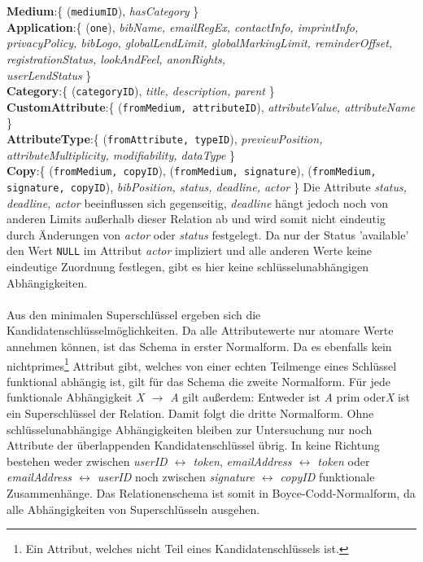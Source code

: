 \documentclass{article}
\begin{document}
\textbf{Medium}:\{ (\texttt{mediumID}), \textit{hasCategory} \}\\
\textbf{Application}:\{ (\texttt{one}),\textit{ bibName, emailRegEx, contactInfo, imprintInfo, privacyPolicy, bibLogo, globalLendLimit, globalMarkingLimit, reminderOffset, registrationStatus, lookAndFeel, anonRights,\\ userLendStatus} \}\\
\textbf{Category}:\{ (\texttt{categoryID}), \textit{title, description, parent} \}\\
\textbf{CustomAttribute}:\{ (\texttt{fromMedium, attributeID}),  \textit{attributeValue, attributeName} \}\\
\textbf{AttributeType}:\{ (\texttt{fromAttribute, typeID}), \textit{previewPosition, attributeMultiplicity, modifiability, dataType} \}\\
\textbf{Copy}:\{ (\texttt{fromMedium, copyID}), (\texttt{fromMedium, signature}), (\texttt{fromMedium, signature, copyID}), \textit{bibPosition, status, deadline, actor} \}
Die Attribute \textit{status, deadline, actor} beeinflussen sich gegenseitig, \textit{deadline} hängt jedoch noch von anderen Limits außerhalb dieser Relation ab und wird somit nicht eindeutig durch Änderungen von \textit{actor} oder \textit{status} festgelegt. Da nur der Status 'available' den Wert \texttt{NULL} im Attribut \textit{actor} impliziert und alle anderen Werte keine eindeutige Zuordnung festlegen, gibt es hier keine schlüsselunabhängigen Abhängigkeiten.\\
\\
Aus den minimalen Superschlüssel ergeben sich die Kandidatenschlüsselmöglichkeiten. Da alle Attributewerte nur atomare Werte annehmen können, ist das Schema in erster Normalform. Da es ebenfalls kein nichtprimes\footnote{Ein Attribut, welches nicht Teil eines Kandidatenschlüssels ist.} Attribut gibt, welches von einer echten Teilmenge eines Schlüssel funktional abhängig ist, gilt für das Schema die zweite Normalform. Für jede funktionale Abhängigkeit \textit{X $\rightarrow$ A} gilt außerdem: Entweder ist \textit{A} prim oder\textit{X} ist ein Superschlüssel der Relation. Damit folgt die dritte Normalform. Ohne schlüsselunabhängige Abhängigkeiten bleiben zur Untersuchung nur noch Attribute der überlappenden Kandidatenschlüssel übrig. In keine Richtung bestehen weder zwischen \textit{userID $\leftrightarrow$ token}, \textit{emailAddress $\leftrightarrow$ token} oder \textit{emailAddress $\leftrightarrow$ userID} noch zwischen \textit{signature $\leftrightarrow$ copyID} funktionale Zusammenhänge. Das Relationenschema ist somit in Boyce-Codd-Normalform, da alle Abhängigkeiten von Superschlüsseln ausgehen.
\end{document}
